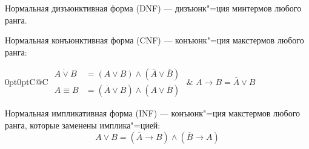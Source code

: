 {\bold Нормальная дизъюнктивная форма} {\ital (DNF)} --- дизъюнк"=ция минтермов любого ранга.

{\bold Нормальная конъюнктивная форма} {\ital (CNF)} --- конъюнк"=ция макстермов любого ранга:
\begin{theorem}
\begin{tabularcx}{0pt}{0pt}{C@{\hspace*{-16pt}}C}{\textwidth}
$\begin{aligned}
A\dot{\lor}B&=(A\lor B)\land(\overline{A}\lor\overline{B})\\
A\equiv B&=(\overline{A}\lor B)\land(A\lor\overline{B})
\end{aligned}$\hspace*{-18pt} & $A\rightarrow B=\overline{A}\lor B$
\end{tabularcx}
\end{theorem}
{\bold Нормальная импликативная форма} {\ital (INF)} --- конъюнк"=ция макстермов любого ранга, которые заменены имплика"=цией:
$$A\lor B=(\overline{A}\rightarrow B)\land(\overline{B}\to A)$$
